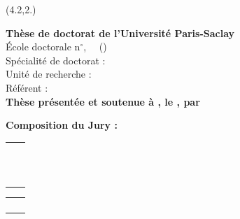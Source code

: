 \begin{titlepage}
\begin{singlespace}
\begin{textblock}{11}(4.2,2.)
	
	\color{bordeau}
	\begin{flushright}

		\huge{\PhDTitle} \bigskip %
		\vfill
		\color{black} %
		\normalsize {\bf Thèse de doctorat de l'Université Paris-Saclay} \bigskip\\
		\vfill
		École doctorale n$^{\circ}$\ecodocnum, ~\ecodoctitle ~(\ecodocacro) \\
		\small{Spécialité de doctorat : \PhDspeciality} \\ %
		\footnotesize{Unité de recherche : \PhDresearchunit}  \\%
		\footnotesize{Référent : \PhDreferent}\bigskip \\ %

		\vspace{8mm}  
		\small{\bf Thèse présentée et soutenue à , le , par} \bigskip
		\vfill
		\Large{\color{bordeau}\textbf{\PhDName}} %
		\vfill
	\end{flushright}
	\vspace{10mm}
	\color{black}

	\begin{flushleft}
	\small \textbf{Composition du Jury :}
	\vfill
	\footnotesize
	\begin{tabular}{|p{10.5cm}l}
		\arrayrulecolor{bordeau}
		\textbf{\jurynameA} & \juryroleA  \\ \juryadressA \\[5pt]
		\textbf{\jurynameB} & \juryroleB  \\ \juryadressB \\[5pt]
		\textbf{\jurynameC} & \juryroleC  \\ \juryadressC \\[5pt]
		\textbf{\jurynameD} & \juryroleD  \\ \juryadressD \\[5pt]
		\textbf{\jurynameE} & \juryroleE  \\ \juryadressE \\[5pt]
		\textbf{\jurynameF} & \juryroleF  \\ \juryadressF \\[5pt]
	\end{tabular} 
	\vfill
	\begin{tabular}{p{10.5cm}l}
		\textbf{\jurynameG} & \juryroleG  \\ \juryadressG \\[5pt]
		\textbf{\jurynameH} & \juryroleH  \\ \juryadressH \\[5pt]
	\end{tabular} 
	\end{flushleft}   
\end{textblock}
\end{singlespace}
\end{titlepage}
\afterpage{\blankpagewithcount}

